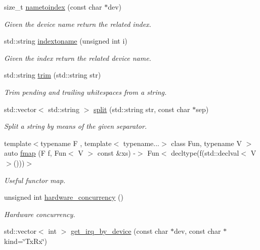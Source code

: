 \begin{DoxyCompactItemize}
size\+\_\+t \hyperlink{namespacepfq_aa68a4c07117073eeb820b32f955dda00}{nametoindex} (const char $\ast$dev)
\begin{DoxyCompactList}\small\item\em Given the device name return the related index. \end{DoxyCompactList}\item 
std\+::string \hyperlink{namespacepfq_a7bf753b90ae15e20c86f40ba59c87c36}{indextoname} (unsigned int i)
\begin{DoxyCompactList}\small\item\em Given the index return the related device name. \end{DoxyCompactList}\item 
std\+::string \hyperlink{namespacepfq_a02a1861a64cc518394d3cc4361799c9f}{trim} (std\+::string str)
\begin{DoxyCompactList}\small\item\em Trim pending and trailing whitespaces from a string. \end{DoxyCompactList}\item 
std\+::vector$<$ std\+::string $>$ \hyperlink{namespacepfq_a0c3aeb61dfd544cb08cb240202caf213}{split} (std\+::string str, const char $\ast$sep)
\begin{DoxyCompactList}\small\item\em Split a string by means of the given separator. \end{DoxyCompactList}\item 
{\footnotesize template$<$typename F , template$<$ typename...$>$ class Fun, typename V $>$ }\\auto \hyperlink{namespacepfq_a75e00e20d4294c941fce79c9e884201a}{fmap} (F f, Fun$<$ V $>$ const \&xs) -\/$>$ Fun$<$ decltype(f(std\+::declval$<$ V $>$()))$>$
\begin{DoxyCompactList}\small\item\em Useful functor map. \end{DoxyCompactList}\item 
unsigned int \hyperlink{namespacepfq_a9a9e9be8b77976ed45483448f54de1f9}{hardware\+\_\+concurrency} ()
\begin{DoxyCompactList}\small\item\em Hardware concurrency. \end{DoxyCompactList}\item 
std\+::vector$<$ int $>$ \hyperlink{namespacepfq_ad3359e328bf6619dc4595eadb0d354ba}{get\+\_\+irq\+\_\+by\+\_\+device} (const char $\ast$dev, const char $\ast$kind=\char`\"{}Tx\+Rx\char`\"{})

\end{DoxyCompactItemize}
